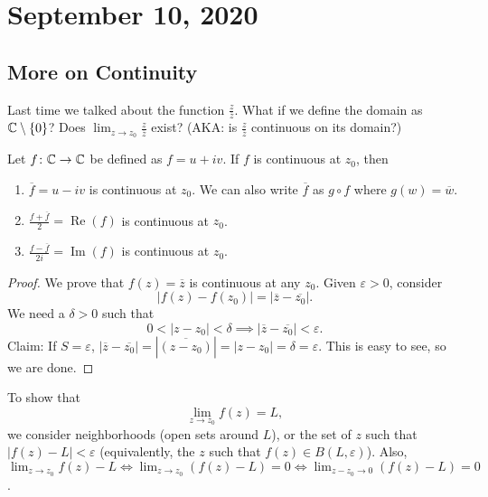 \section{September 10, 2020}
\subsection{More on Continuity}
Last time we talked about the function $\frac{z}{\overline{z}}$. What if we define the domain as $\mathbb{C}\setminus \{0\} $? Does $\lim_{z\to z_0}\frac{z}{\overline{z}}$ exist? (AKA: is $\frac{z}{\overline{z}}$ continuous on its domain?)
\begin{theorem}
    Let $f \colon \mathbb{C} \to \mathbb{C}$ be defined as $f=u+iv$. If $f$ is continuous at $z_0$, then
    \begin{enumerate}
        \item  $\overline{f}=u-iv$ is continuous at $z_0$. We can also write $\overline{f}$ as $g\circ f$ where $g(w)=\overline{w}$.
        \item   $\frac{f+\overline{f}}{2}=\operatorname{Re}(f)$ is continuous at $z_0$.
        \item  $\frac{f-\overline{f}}{2i}=\operatorname{Im}(f)$ is continuous at $z_0.$
    \end{enumerate}
\end{theorem}
\begin{proof}
    We prove that $f(z)=\overline{z}$ is continuous at any $z_0$. Given $\varepsilon > 0$, consider \[
        |f(z)-f(z_0)|=|\overline{z}-\overline{z_0}|.
    \]
   We need a $\delta > 0$ such that \[
   0<|z-z_0|<\delta \implies |\overline{z}-\overline{z_0}| < \varepsilon.
   \]
   Claim: If $S=\varepsilon$, $|\overline{z}-\overline{z_0}|=|\overline{(z-z_0)}|=|z-z_0|=\delta=\varepsilon$. This is easy to see, so we are done.
\end{proof}
\begin{note}
    To show that \[
        \lim_{z\to z_0}f(z)=L,
    \]
    we consider neighborhoods (open sets around $L$), or the set of $z$ such that $|f(z)-L|<\varepsilon$ (equivalently, the $z$ such that $f(z) \in B(L, \varepsilon)$). Also, $\lim_{z\to z_0}f(z)-L \iff \lim_{z\to z_0}(f(z)-L)=0 \iff \lim_{z-z_0\to 0}(f(z)-L)=0$.
\end{note}

